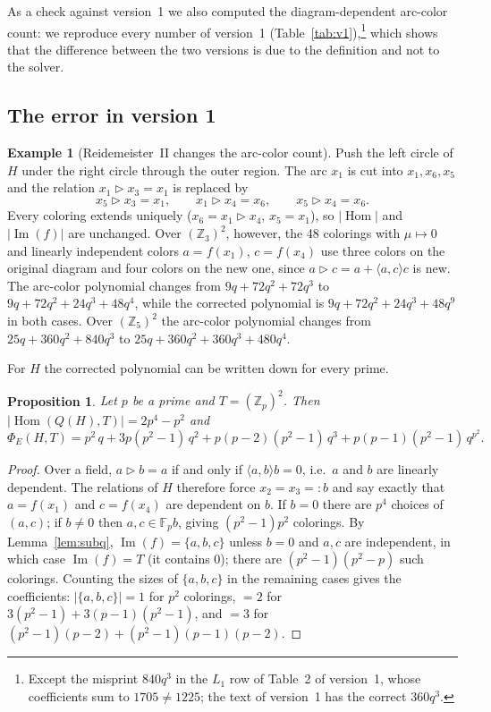 \documentclass[11pt]{article}
\newtheorem{proposition}[theorem]{Proposition}
\theoremstyle{definition}
\newtheorem{example}[theorem]{Example}
\newcommand{\Z}{\mathbb{Z}}
\newcommand{\F}{\mathbb{F}}
\newcommand{\Hom}{\operatorname{Hom}}
\renewcommand{\Im}{\operatorname{Im}}
\newcommand{\tr}{\triangleright}
\newcommand{\PhiE}{\Phi_E}
\begin{document}
As a check against version~1 we also computed the diagram-dependent arc-color count: we reproduce
every number of version~1 (Table~\ref{tab:v1}),\footnote{Except the misprint $840q^3$ in the $L_1$ row of
Table~2 of version~1, whose coefficients sum to $1705\neq1225$; the text of version~1 has the correct
$360q^3$.} which shows that the difference between the two versions is due to the definition and not to
the solver.

\subsection{The error in version 1}\label{ssec:error}

\begin{example}[Reidemeister~II changes the arc-color count]\label{ex:R2}
Push the left circle of $H$ under the right circle through the outer region. The arc $x_1$ is cut into
$x_1,x_6,x_5$ and the relation $x_1\tr x_3=x_1$ is replaced by
\[
x_5\tr x_3=x_1,\qquad x_1\tr x_4=x_6,\qquad x_5\tr x_4=x_6 .
\]
Every coloring extends uniquely ($x_6=x_1\tr x_4$, $x_5=x_1$), so $|\Hom|$ and $|\Im(f)|$ are unchanged.
Over $(\Z_3)^2$, however, the 48 colorings with $\mu\mapsto0$ and linearly independent colors
$a=f(x_1)$, $c=f(x_4)$ use three colors on the original diagram and four colors on the new one, since
$a\tr c=a+\langle a,c\rangle c$ is new. The arc-color polynomial changes from $9q+72q^2+72q^3$ to
$9q+72q^2+24q^3+48q^4$, while the corrected polynomial is $9q+72q^2+24q^3+48q^9$ in both cases. Over
$(\Z_5)^2$ the arc-color polynomial changes from $25q+360q^2+840q^3$ to $25q+360q^2+360q^3+480q^4$.
\end{example}

For $H$ the corrected polynomial can be written down for every prime.

\begin{proposition}\label{prop:H}
Let $p$ be a prime and $T=(\Z_p)^2$. Then $|\Hom(Q(H),T)|=2p^4-p^2$ and
\[
\PhiE(H,T)=p^2\,q+3p(p^2-1)\,q^2+p(p-2)(p^2-1)\,q^3+p(p-1)(p^2-1)\,q^{p^2}.
\]
\end{proposition}

\begin{proof}
Over a field, $a\tr b=a$ if and only if $\langle a,b\rangle b=0$, i.e.\ $a$ and $b$ are linearly
dependent. The relations of $H$ therefore force $x_2=x_3=:b$ and say exactly that $a=f(x_1)$ and
$c=f(x_4)$ are dependent on $b$. If $b=0$ there are $p^4$ choices of $(a,c)$; if $b\neq0$ then
$a,c\in\F_pb$, giving $(p^2-1)p^2$ colorings. By Lemma~\ref{lem:subq}, $\Im(f)=\{a,b,c\}$ unless
$b=0$ and $a,c$ are independent, in which case $\Im(f)=T$ (it contains $0$); there are
$(p^2-1)(p^2-p)$ such colorings. Counting the sizes of $\{a,b,c\}$ in the remaining cases gives the
coefficients: $|\{a,b,c\}|=1$ for $p^2$ colorings, $=2$ for $3(p^2-1)+3(p-1)(p^2-1)$, and $=3$ for
$(p^2-1)(p-2)+(p^2-1)(p-1)(p-2)$.
\end{proof}
\end{document}
